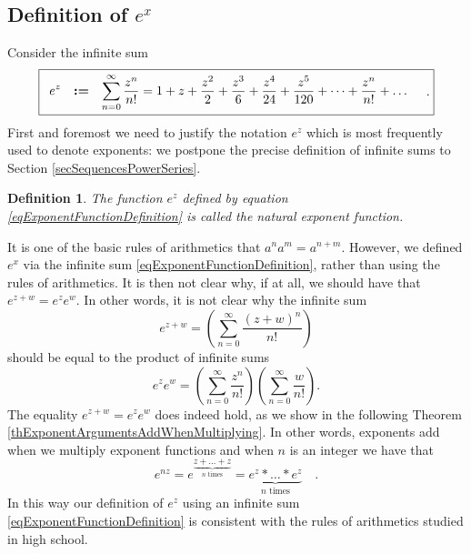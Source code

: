 \documentclass[12pt]{book}
\newcommand{\eqdef}{\textbf{:=}}
\newcommand{\importantFormula}[1]{\begin{equation} \boxed{#1} \end{equation}}
\newtheorem{definition}[theorem]{Definition}
\begin{document}
\subsection{Definition of $e^x$}
Consider the infinite sum
\importantFormula{\label{eqExponentFunctionDefinition}
\begin{array}{rcl}
\displaystyle e^{z}&\eqdef &\displaystyle \sum_{n=0}^{\infty} \frac{z^n}{n!} = 1+z+\frac{z^{2}}{2}+\frac{z^3}{6}+\frac{z^4}{24}+\frac{z^5}{120}+\dots+\frac{z^n}{n!}+\dots\\
\end{array} \quad .
}
First and foremost we need to justify the notation $e^z$ which is most frequently used to denote exponents: we postpone the precise definition of infinite sums to Section \ref{secSequencesPowerSeries}.
\begin{definition}\label{defNaturalExponent}
 The function $e^z$ defined by equation \eqref{eqExponentFunctionDefinition} is called the natural exponent function.
\end{definition}
It is one of the basic rules of arithmetics that $a^n a^{m}= a^{n+m} $. However, we defined $e^x$ via the infinite sum \eqref{eqExponentFunctionDefinition}, rather than using the rules of arithmetics. It is then not clear why, if at all, we should have that $e^{z+w}=e^{z}e^{w}$. In other words, it is not clear why the infinite sum
\[
e^{z+w} =\left(\sum\limits_{n=0}^{\infty} \frac{(z+w)^n}{n!}\right)
\]
should be equal to the product of infinite sums
\[
e^{z} e^w=\left(\sum\limits_{n=0}^{\infty} \frac{z^n}{n!}\right)\left(\sum\limits_{n=0}^{\infty} \frac{w}{n!} \right) .
\]
The equality $e^{z+w}= e^{z}e^{w}$ does indeed hold, as we show in the following Theorem \ref{thExponentArgumentsAddWhenMultiplying}. In other words, exponents add when we multiply exponent functions and when $n$ is an integer we have that
\begin{equation}\label{eqExponentToIntegerPowerRespectsArithmetics}
e^{n z}= e^{\underbrace{z+\dots +z}_{n\text{ times}} }=\underbrace{ e^{z}*\dots * e^{z}}_{n \text{ times}}  \quad .
\end{equation}
In this way our definition of  $e^{z}$ using an infinite sum \eqref{eqExponentFunctionDefinition} is consistent with the rules of arithmetics studied in high school.
\end{document}
